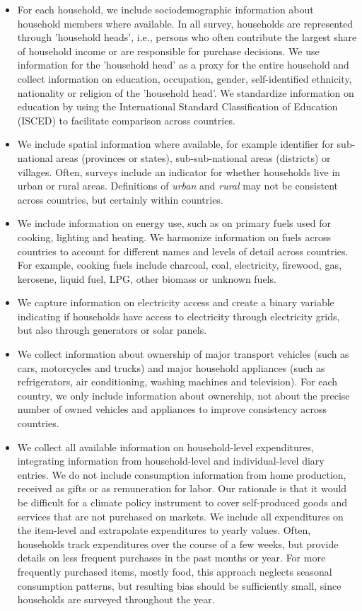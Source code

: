 \documentclass[12pt, a4paper]{article}
\begin{document}
\begin{refsection}
\begin{itemize}
    \item For each household, we include sociodemographic information about household members where available. In all survey, households are represented through 'household heads', i.e., persons who often contribute the largest share of household income or are responsible for purchase decisions. We use information for the 'household head' as a proxy for the entire household and collect information on education, occupation, gender, self-identified ethnicity, nationality or religion of the 'household head'. We standardize information on education by using the International Standard Classification of Education (ISCED) to facilitate comparison across countries.
    \item We include spatial information where available, for example identifier for sub-national areas (provinces or states), sub-sub-national areas (districts) or villages. Often, surveys include an indicator for whether households live in urban or rural areas. Definitions of \textit{urban} and \textit{rural} may not be consistent across countries, but certainly within countries.
    \item We include information on energy use, such as on primary fuels used for cooking, lighting and heating. We harmonize information on fuels across countries to account for different names and levels of detail across countries. For example, cooking fuels include charcoal, coal, electricity, firewood, gas, kerosene, liquid fuel, LPG, other biomass or unknown fuels.
    \item We capture information on electricity access and create a binary variable indicating if households have access to electricity through electricity grids, but also through generators or solar panels. 
    \item We collect information about ownership of major transport vehicles (such as cars, motorcycles and trucks) and major household appliances (such as refrigerators, air conditioning, washing machines and television). For each country, we only include information about ownership, not about the precise number of owned vehicles and appliances to improve consistency across countries.
    \item We collect all available information on household-level expenditures, integrating information from household-level and individual-level diary entries. We do not include consumption information from home production, received as gifts or as remuneration for labor. Our rationale is that it would be difficult for a climate policy instrument to cover self-produced goods and services that are not purchased on markets. We include all expenditures on the item-level and extrapolate expenditures to yearly values. Often, households track expenditures over the course of a few weeks, but provide details on less frequent purchases in the past months or year. For more frequently purchased items, mostly food, this approach neglects seasonal consumption patterns, but resulting bias should be sufficiently small, since households are surveyed throughout the year.

\end{itemize}
\end{refsection}
\end{document}
